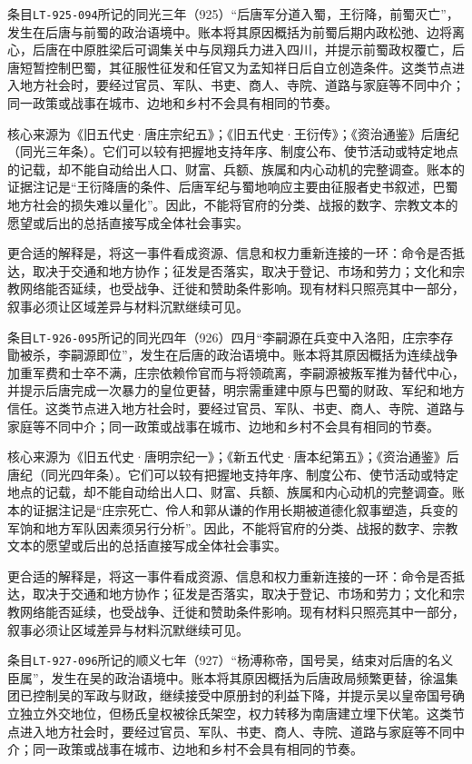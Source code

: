 条目\texttt{LT-925-094}所记的同光三年（925）“后唐军分道入蜀，王衍降，前蜀灭亡”，发生在后唐与前蜀的政治语境中。账本将其原因概括为前蜀后期内政松弛、边将离心，后唐在中原胜梁后可调集关中与凤翔兵力进入四川，并提示前蜀政权覆亡，后唐短暂控制巴蜀，其征服性征发和任官又为孟知祥日后自立创造条件。这类节点进入地方社会时，要经过官员、军队、书吏、商人、寺院、道路与家庭等不同中介；同一政策或战事在城市、边地和乡村不会具有相同的节奏。

核心来源为《旧五代史·唐庄宗纪五》；《旧五代史·王衍传》；《资治通鉴》后唐纪（同光三年条）。它们可以较有把握地支持年序、制度公布、使节活动或特定地点的记载，却不能自动给出人口、财富、兵额、族属和内心动机的完整调查。账本的证据注记是“王衍降唐的条件、后唐军纪与蜀地响应主要由征服者史书叙述，巴蜀地方社会的损失难以量化”。因此，不能将官府的分类、战报的数字、宗教文本的愿望或后出的总括直接写成全体社会事实。

更合适的解释是，将这一事件看成资源、信息和权力重新连接的一环：命令是否抵达，取决于交通和地方协作；征发是否落实，取决于登记、市场和劳力；文化和宗教网络能否延续，也受战争、迁徙和赞助条件影响。现有材料只照亮其中一部分，叙事必须让区域差异与材料沉默继续可见。

条目\texttt{LT-926-095}所记的同光四年（926）四月“李嗣源在兵变中入洛阳，庄宗李存勖被杀，李嗣源即位”，发生在后唐的政治语境中。账本将其原因概括为连续战争加重军费和士卒不满，庄宗依赖伶官而与将领疏离，李嗣源被叛军推为替代中心，并提示后唐完成一次暴力的皇位更替，明宗需重建中原与巴蜀的财政、军纪和地方信任。这类节点进入地方社会时，要经过官员、军队、书吏、商人、寺院、道路与家庭等不同中介；同一政策或战事在城市、边地和乡村不会具有相同的节奏。

核心来源为《旧五代史·唐明宗纪一》；《新五代史·唐本纪第五》；《资治通鉴》后唐纪（同光四年条）。它们可以较有把握地支持年序、制度公布、使节活动或特定地点的记载，却不能自动给出人口、财富、兵额、族属和内心动机的完整调查。账本的证据注记是“庄宗死亡、伶人和郭从谦的作用长期被道德化叙事塑造，兵变的军饷和地方军队因素须另行分析”。因此，不能将官府的分类、战报的数字、宗教文本的愿望或后出的总括直接写成全体社会事实。

更合适的解释是，将这一事件看成资源、信息和权力重新连接的一环：命令是否抵达，取决于交通和地方协作；征发是否落实，取决于登记、市场和劳力；文化和宗教网络能否延续，也受战争、迁徙和赞助条件影响。现有材料只照亮其中一部分，叙事必须让区域差异与材料沉默继续可见。

条目\texttt{LT-927-096}所记的顺义七年（927）“杨溥称帝，国号吴，结束对后唐的名义臣属”，发生在吴的政治语境中。账本将其原因概括为后唐政局频繁更替，徐温集团已控制吴的军政与财政，继续接受中原册封的利益下降，并提示吴以皇帝国号确立独立外交地位，但杨氏皇权被徐氏架空，权力转移为南唐建立埋下伏笔。这类节点进入地方社会时，要经过官员、军队、书吏、商人、寺院、道路与家庭等不同中介；同一政策或战事在城市、边地和乡村不会具有相同的节奏。

